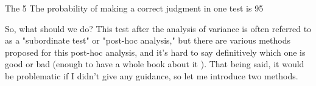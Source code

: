 \documentclass{ltjbook}
\begin{document}
The 5%
The probability of making a correct judgment in one test is 95%


So, what should we do? This test after the analysis of variance is often referred to as a "subordinate test" or "post-hoc analysis," but there are various methods proposed for this post-hoc analysis, and it's hard to say definitively which one is good or bad (enough to have a whole book about it \parencite{BA33892274}). That being said, it would be problematic if I didn't give any guidance, so let me introduce two methods.
\end{document}
